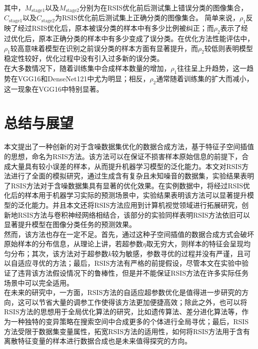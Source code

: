 \documentclass{NauThesis}
\begin{document}
其中，$M_{\text{stage1}}$以及$M_{\text{stage2}}$分别为在RSIS优化前后测试集上错误分类的图像集合，$C_{\text{stage1}}$以及$C_{\text{stage2}}$为RSIS优化前后测试集上正确分类的图像集合。
简单来说，$\rho_1$反映了经过RSIS优化后，原本被误分类的样本中有多少比例被纠正；而$\rho_2$表示了经过优化后，原本正确分类的样本中有多少变成了误分类。在优化方法性能评估中，$\rho_1$较高意味着模型在识别之前误分类的样本方面有显著提升，而$\rho_2$较低则表明模型稳定性较好，优化过程中没有引入过多新的误分类。
\\\hspace*{2em}在大多数情况下，随着训练集中合成样本数量的增加，$\rho_1$往往呈上升趋势，这一趋势在VGG16和DenseNet121中尤为明显；相反，$\rho_2$通常随着训练集的扩大而减小，这一现象在VGG16中特别显著。

\chapter{总结与展望}
本文提出了一种创新的对于含噪数据集优化的数据合成方法，基于特征子空间插值的思想，命名为RSIS方法。该方法可以在保证不损害样本原始信息的前提下，合成大量具有较小误差的样本，从而提升机器学习模型的泛化能力。本文对RSIS方法进行了全面的模拟研究，通过生成含有复杂且未知噪音的数据集，实验结果表明了RSIS方法对于含噪数据集具有显著的优化效果。在实例数据中，将经过RSIS优化后的样本用于机器学习实际的预测场景中，实验结果表明该方法可以显著提升模型的泛化能力。并且本文还将RSIS方法应用到计算机视觉领域进行拓展研究，创新地RSIS方法与卷积神经网络相结合，该部分的实验同样表明RSIS方法依旧可以显著提升模型在图像分类任务的预测效果。
\\\hspace*{2em}然而，该方法也存在一定不足。首先，通过这种子空间插值的数据合成方式会破坏原始样本的分布信息，从理论上讲，若超参数$\eta$取无穷大，则样本的特征会呈现均匀分布；其次，该方法对于超参数$k$较为敏感，参数寻优的过程并没有严谨，且可以自适应寻优的方法；最后，RSIS方法有严格的前提假设，尽管本文在实验中验证了违背该方法假设情况下的鲁棒性，但是并不能保证RSIS方法在许多实际任务场景中可以完全适用。
\\\hspace*{2em}在未来的研究中，一方面，RSIS方法的自适应超参数优化是值得进一步研究的方向，这可以节省大量的调参工作使得该方法更加便捷高效；除此之外，也可以将RSIS方法的思想用于全局优化算法的研究，比如遗传算法、差分进化算法等，作为一种独特的变异策略在搜索空间中合成更多的个体进行全局寻优；最后，RSIS方法受限于数据集变量属性，拓宽RSIS方法的适用性，如何将RSIS方法用于含有离散特征变量的样本进行数据合成也是未来值得探究的方向。
\end{document}
